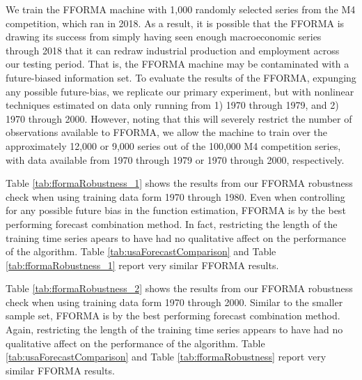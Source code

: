 \documentclass[12pt]{article}
\begin{document}




We train the FFORMA machine with 1,000 randomly selected series from the M4 competition, which ran in 2018. As a result, it is possible that the FFORMA is drawing its success from simply having seen enough macroeconomic series through 2018 that it can redraw industrial production and employment across our testing period. That is, the FFORMA machine may be contaminated with a future-biased information set. To evaluate the results of the FFORMA, expunging any possible future-bias, we replicate our primary experiment, but with nonlinear techniques estimated on data only running from 1) 1970 through 1979, and 2) 1970 through 2000. However, noting that this will severely restrict the number of observations available to FFORMA, we allow the machine to train over the approximately 12,000 or 9,000 series out of the 100,000 M4 competition series, with data available from 1970 through 1979 or 1970 through 2000, respectively. 

Table \ref{tab:fformaRobustness_1} shows the results from our FFORMA robustness check when using training data form 1970 through 1980. Even when controlling for any possible future bias in the function estimation, FFORMA is by the best performing forecast combination method. In fact, restricting the length of the training time series apears to have had no qualitative affect on the performance of the algorithm. Table \ref{tab:usaForecastComparison} and Table \ref{tab:fformaRobustness_1} report very similar FFORMA results.  

Table \ref{tab:fformaRobustness_2} shows the results from our FFORMA robustness check when using training data form 1970 through 2000. Similar to the smaller sample set, FFORMA is by the best performing forecast combination method. Again, restricting the length of the training time series appears to have had no qualitative affect on the performance of the algorithm. Table \ref{tab:usaForecastComparison} and Table \ref{tab:fformaRobustness} report very similar FFORMA results. 

\end{document}
